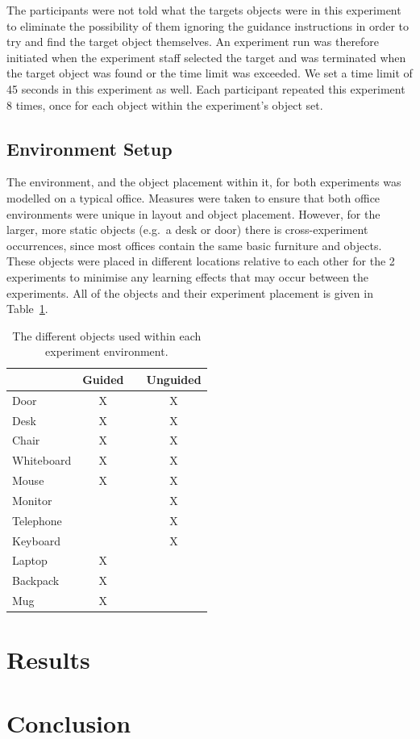 \documentclass[runningheads]{llncs}
\begin{document}
The participants were not told what the targets objects were in this experiment to eliminate the possibility of them ignoring the guidance instructions in order to try and find the target object themselves.
An experiment run was therefore initiated when the experiment staff selected the target and was terminated when the target object was found or the time limit was exceeded.
We set a time limit of 45 seconds in this experiment as well.
Each participant repeated this experiment 8 times, once for each object within the experiment's object set. 

\subsection{Environment Setup}

The environment, and the object placement within it, for both experiments was modelled on a typical office.
Measures were taken to ensure that both office environments were unique in layout and object placement. 
However, for the larger, more static objects (e.g.\ a desk or door) there is cross-experiment occurrences, since most offices contain the same basic furniture and objects. 
These objects were placed in different locations relative to each other for the 2 experiments to minimise any learning effects that may occur between the experiments. 
All of the objects and their experiment placement is given in Table~\ref{tab:objects}.

\begin{table}
  \centering
  \caption{The different objects used within each experiment environment.}\label{tab:objects}
  \begin{tabular}{p{2cm}cp{0.7cm}c}
    \toprule
    & \bf{Guided} & & \bf{Unguided} \\\midrule
    Door        & X & & X \\\midrule
    Desk	& X & & X \\\midrule
    Chair	& X & & X \\\midrule
    Whiteboard	& X & & X \\\midrule
    Mouse	& X & & X \\\midrule
    Monitor	&   & & X \\\midrule
    Telephone	&   & & X \\\midrule
    Keyboard	&   & & X \\\midrule
    Laptop	& X & &   \\\midrule
    Backpack	& X & &   \\\midrule
    Mug		& X & &   \\\midrule
    \bottomrule
  \end{tabular}
\end{table}

\section{Results}

\section{Conclusion}



\end{document}
